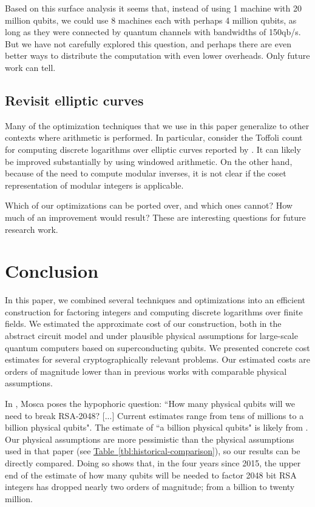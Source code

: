 \documentclass[superscriptaddress,notitlepage,longbibliography]{revtex4-1}
\theoremstyle{definition}
\theoremstyle{definition}
\newcommand{\tbl}[1]{\hyperref[tbl:#1]{Table~\ref*{tbl:#1}}}
\begin{document}
Based on this surface analysis it seems that, instead of using 1 machine with 20 million qubits, we could use 8 machines each with perhaps 4 million qubits, as long as they were connected by quantum channels with bandwidths of 150qb/s.
But we have not carefully explored this question, and perhaps there are even better ways to distribute the computation with even lower overheads.
Only future work can tell.

\subsection{Revisit elliptic curves}
\label{sec:revisit-elliptic-curves}

Many of the optimization techniques that we use in this paper generalize to other contexts where arithmetic is performed.
In particular, consider the Toffoli count for computing discrete logarithms over elliptic curves reported by \cite{roetteler2017quantum}.
It can likely be improved substantially by using windowed arithmetic.
On the other hand, because of the need to compute modular inverses, it is not clear if the coset representation of modular integers is applicable.

Which of our optimizations can be ported over, and which ones cannot?
How much of an improvement would result?
These are interesting questions for future research work.




\section{Conclusion}
\label{sec:conclusion}

In this paper, we combined several techniques and optimizations into an efficient construction for factoring integers and computing discrete logarithms over finite fields.
We estimated the approximate cost of our construction, both in the abstract circuit model and under plausible physical assumptions for large-scale quantum computers based on superconducting qubits.
We presented concrete cost estimates for several cryptographically relevant problems.
Our estimated costs are orders of magnitude lower than in previous works with comparable physical assumptions.

In \cite{mosca2018cybersecurity}, Mosca poses the hypophoric question: ``How many physical qubits will we need to break RSA-2048? [...] Current estimates range from tens of millions to a billion physical qubits".
The estimate of ``a billion physical qubits" is likely from \cite{fowler2012surfacecodereview}.
Our physical assumptions are more pessimistic than the physical assumptions used in that paper (see \tbl{historical-comparison}), so our results can be directly compared.
Doing so shows that, in the four years since 2015, the upper end of the estimate of how many qubits will be needed to factor 2048 bit RSA integers has dropped nearly two orders of magnitude; from a billion to twenty million.
\end{document}
